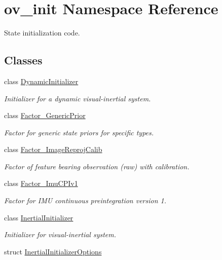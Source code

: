 \hypertarget{namespaceov__init}{}\section{ov\+\_\+init Namespace Reference}
\label{namespaceov__init}


State initialization code.  


\subsection*{Classes}
\begin{DoxyCompactItemize}
\item 
class \hyperlink{classov__init_1_1DynamicInitializer}{Dynamic\+Initializer}
\begin{DoxyCompactList}\small\item\em Initializer for a dynamic visual-\/inertial system. \end{DoxyCompactList}\item 
class \hyperlink{classov__init_1_1Factor__GenericPrior}{Factor\+\_\+\+Generic\+Prior}
\begin{DoxyCompactList}\small\item\em Factor for generic state priors for specific types. \end{DoxyCompactList}\item 
class \hyperlink{classov__init_1_1Factor__ImageReprojCalib}{Factor\+\_\+\+Image\+Reproj\+Calib}
\begin{DoxyCompactList}\small\item\em Factor of feature bearing observation (raw) with calibration. \end{DoxyCompactList}\item 
class \hyperlink{classov__init_1_1Factor__ImuCPIv1}{Factor\+\_\+\+Imu\+C\+P\+Iv1}
\begin{DoxyCompactList}\small\item\em Factor for I\+MU continuous preintegration version 1. \end{DoxyCompactList}\item 
class \hyperlink{classov__init_1_1InertialInitializer}{Inertial\+Initializer}
\begin{DoxyCompactList}\small\item\em Initializer for visual-\/inertial system. \end{DoxyCompactList}\item 
struct \hyperlink{structov__init_1_1InertialInitializerOptions}{Inertial\+Initializer\+Options}

\end{DoxyCompactItemize}
